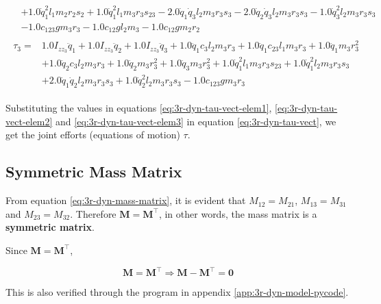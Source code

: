 \begin{align}
\begin{split}
            & + 1.0 \dot{q}_1^{2} l_{1} m_{2} r_{2} s_{2} + 1.0 \dot{q}_1^{2} l_{1} m_{3} r_{3} s_{23} - 2.0 \dot{q}_1 \dot{q}_3 l_{2} m_{3} r_{3} s_{3} - 2.0 \dot{q}_2 \dot{q}_3 l_{2} m_{3} r_{3} s_{3} - 1.0 \dot{q}_3^{2} l_{2} m_{3} r_{3} s_{3} \\
            & - 1.0 c_{123} g m_{3} r_{3} - 1.0 c_{12} g l_{2} m_{3} - 1.0 c_{12} g m_{2} r_{2}
    \end{split}
    \label{eq:3r-dyn-tau-vect-elem2}
    \\
    \begin{split}
        \tau_3 =& 1.0 I_{zz_3} \ddot{q}_1 + 1.0 I_{zz_3} \ddot{q}_2 + 1.0 I_{zz_3} \ddot{q}_3 + 1.0 \ddot{q}_1 c_{3} l_{2} m_{3} r_{3} + 1.0 \ddot{q}_1 c_{23} l_{1} m_{3} r_{3} + 1.0 \ddot{q}_1 m_{3} r_{3}^{2} \\
            & + 1.0 \ddot{q}_2 c_{3} l_{2} m_{3} r_{3} + 1.0 \ddot{q}_2 m_{3} r_{3}^{2} + 1.0 \ddot{q}_3 m_{3} r_{3}^{2} + 1.0 \dot{q}_1^{2} l_{1} m_{3} r_{3} s_{23} + 1.0 \dot{q}_1^{2} l_{2} m_{3} r_{3} s_{3} \\
            & + 2.0 \dot{q}_1 \dot{q}_2 l_{2} m_{3} r_{3} s_{3} + 1.0 \dot{q}_2^{2} l_{2} m_{3} r_{3} s_{3} - 1.0 c_{123} g m_{3} r_{3}
    \end{split}
    \label{eq:3r-dyn-tau-vect-elem3}
\end{align}

Substituting the values in equations \ref{eq:3r-dyn-tau-vect-elem1}, \ref{eq:3r-dyn-tau-vect-elem2} and \ref{eq:3r-dyn-tau-vect-elem3} in equation \ref{eq:3r-dyn-tau-vect}, we get the joint efforts (equations of motion) $\tau$.

\subsection{Symmetric Mass Matrix}

From equation \ref{eq:3r-dyn-mass-matrix}, it is evident that $M_{12} = M_{21}$, $M_{13} = M_{31}$ and $M_{23} = M_{32}$. Therefore $\mathbf{M} = \mathbf{M}^\top$, in other words, the mass matrix is a \textbf{symmetric matrix}.

Since $\mathbf{M} = \mathbf{M}^\top$,

\begin{equation}
    \mathbf{M} = \mathbf{M}^\top
    \Rightarrow \mathbf{M} - \mathbf{M}^\top = \mathbf{0}
\end{equation}

This is also verified through the program in appendix \ref{app:3r-dyn-model-pycode}.

